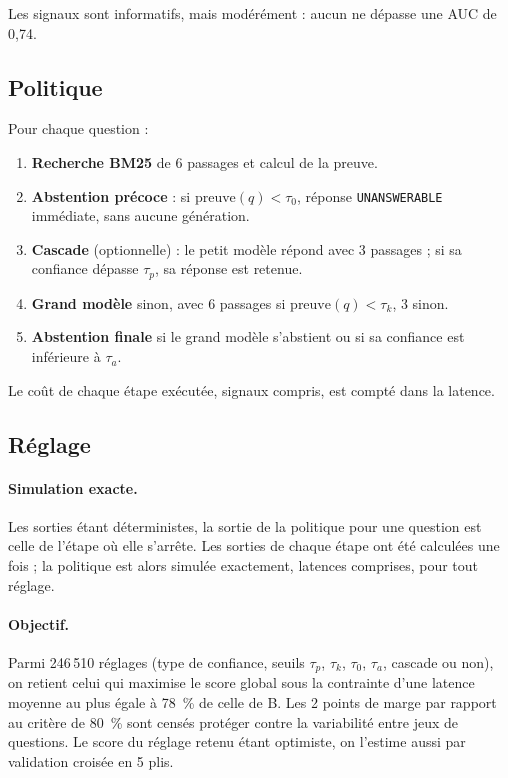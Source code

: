 \documentclass[11pt,a4paper]{article}
\begin{document}
Les signaux sont informatifs, mais modérément : aucun ne dépasse une AUC de 0,74.

\subsection{Politique}

Pour chaque question :
\begin{enumerate}
\item \textbf{Recherche BM25} de 6 passages et calcul de la preuve.
\item \textbf{Abstention précoce} : si $\text{preuve}(q) < \tau_0$, réponse \texttt{UNANSWERABLE}
immédiate, sans aucune génération.
\item \textbf{Cascade} (optionnelle) : le petit modèle répond avec 3 passages ; si sa confiance dépasse
$\tau_p$, sa réponse est retenue.
\item \textbf{Grand modèle} sinon, avec 6 passages si $\text{preuve}(q) < \tau_k$, 3 sinon.
\item \textbf{Abstention finale} si le grand modèle s'abstient ou si sa confiance est inférieure à
$\tau_a$.
\end{enumerate}
Le coût de chaque étape exécutée, signaux compris, est compté dans la latence.

\subsection{Réglage}

\paragraph{Simulation exacte.} Les sorties étant déterministes, la sortie de la politique pour une
question est celle de l'étape où elle s'arrête. Les sorties de chaque étape ont été calculées une fois ;
la politique est alors simulée exactement, latences comprises, pour tout réglage.

\paragraph{Objectif.} Parmi 246\,510 réglages (type de confiance, seuils $\tau_p$, $\tau_k$, $\tau_0$,
$\tau_a$, cascade ou non), on retient celui qui maximise le score global sous la contrainte d'une latence
moyenne au plus égale à 78~\% de celle de B. Les 2 points de marge par rapport au critère de 80~\% sont
censés protéger contre la variabilité entre jeux de questions. Le score du réglage retenu étant
optimiste, on l'estime aussi par validation croisée en 5 plis.
\end{document}
